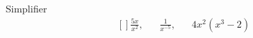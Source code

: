 
\begin{exercice}\label{exoSeconde-0014}

    Simplifier
    \begin{equation}
        \begin{aligned}[]
            \frac{ 5x }{ x^2 },&&\frac{1}{ x^{-5} },&&4x^2(x^3-2)
        \end{aligned}
    \end{equation}

\end{exercice}
